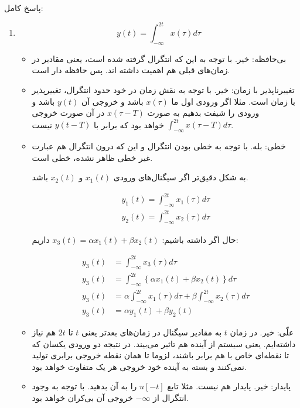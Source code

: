 \documentclass[12pt]{article}
\begin{document}
پاسخ کامل:
\begin{enumerate}[label = \harfi*)]

\item

$$
y(t) =\int_{-\infty}^{2 t} x(\tau) d \tau
$$

\begin{itemize}
	\item
 بی‌حافظه: خیر. با توجه به این که انتگرال گرفته شده است، یعنی مقادیر در زمان‌های قبلی هم اهمیت داشته اند. پس حافظه دار است.
	\item
تغییرناپذیر با زمان: خیر. با توجه به نقش زمان در خود حدود انتگرال، تغییرپذیر با زمان است. مثلا اگر ورودی اول ما $x(\tau)$ باشد و خروجی آن $y(t)$ باشد و ورودی را شیفت بدهیم به صورت
$x(\tau - T)$
در آن صورت خروجی
$\int_{-\infty}^{2t} x(\tau - T) d\tau$
خواهد بود که برابر با $y(t-T)$ نیست.
	\item
خطی: بله. با توجه به خطی بودن انتگرال و این که درون انتگرال هم عبارت غیر خطی ظاهر نشده، خطی است.

به شکل دقیق‌تر اگر سیگنال‌های ورودی $x_1(t)$ و $x_2(t)$ باشد.

$$
\begin{array}{l}
	y_{1}(t)=\int_{-\infty}^{2 t} x_{1}(\tau) d \tau \\
	y_{2}(t)=\int_{-\infty}^{2 t} x_{2}(\tau) d \tau
\end{array}
$$

حال اگر داشته باشیم:
$x_3(t) = \alpha x_1(t) + \beta x_2(t)$
داریم:

$$
\begin{aligned}
	y_{3}(t) &=\int_{-\infty}^{2 t} x_{3}(\tau) d \tau \\
	y_{3}(t) &=\int_{-\infty}^{2 t}\left\{\alpha x_{1}(t)+\beta x_{2}(t)\right\} d \tau \\
	y_{3}(t) &=\alpha \int_{-\infty}^{2 t} x_{1}(\tau) d \tau+\beta \int_{-\infty}^{2 t} x_{2}(\tau) d \tau \\
	y_{3}(t) &=\alpha y_{1}(t)+\beta y_{2}(t)
\end{aligned}
$$
	\item
علّی: خیر. در زمان $t$ به مقادیر سیگنال در زمان‌های بعدتر یعنی $t$ تا $2t$ هم نیاز داشته‌ایم. یعنی سیستم از آینده هم تاثیر می‌بیند. در نتیجه دو ورودی یکسان که تا نقطه‌ای خاص با هم برابر باشند، لزوما تا همان نقطه خروجی برابری تولید نمی‌کنند و بسته به آینده خود خروجی هر یک متفاوت خواهد بود.
	\item
پایدار: خیر. پایدار هم نیست. مثلا تابع $u[-t]$ را به آن بدهید. با توجه به وجود انتگرال از $-\infty$ خروجی آن بی‌کران خواهد بود.
\end{itemize}



\end{enumerate}
\end{document}
